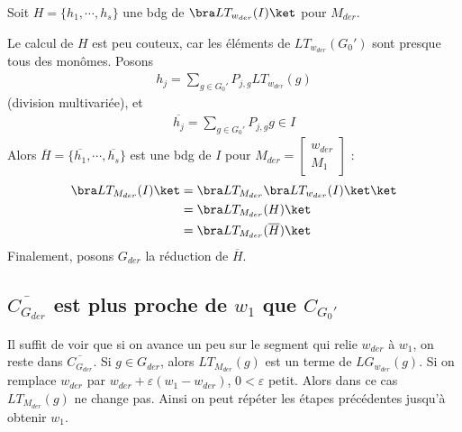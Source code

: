             Soit $H = \{h_1, \cdots, h_s\}$ une bdg de $\bra LT_{w_{der}}(I) \ket$ pour $M_{der}$.
            \begin{remq}
                Le calcul de $H$ est peu couteux, car les éléments de $LT_{w_{der}}(G_0')$ sont presque tous des monômes. Posons
                \begin{align*}
                    h_j = \sum_{g \in G_0'} P_{j,g}LT_{w_{der}}(g)
                \end{align*}
                (division multivariée), et
                \begin{align*}
                    \overline{h_j} = \sum_{g \in G_0'} P_{j,g}g \in I
                \end{align*}
                Alors $\overline{H} = \{\overline{h_1}, \cdots, \overline{h_s}\}$ est une bdg de $I$ pour $M_{der} = \begin{bmatrix} w_{der} \\ M_1 \end{bmatrix}$ :
                \begin{align*}
                    \bra LT_{M_{der}}(I) \ket &= \bra LT_{M_{der}} \bra LT_{w_{der}}(I) \ket \ket \\
                    &= \bra LT_{M_{der}}(H) \ket \\
                    &= \bra LT_{M_{der}}(\overline{H}) \ket \\
                \end{align*}
                Finalement, posons $G_{der}$ la réduction de $\overline{H}$.
            \end{remq}

        \subsection{$\overline{C_{G_{der}}}$ est plus proche de $w_1$ que $C_{G_0'}$}
            Il suffit de voir que si on avance un peu sur le segment qui relie $w_{der}$ à $w_1$, on reste dans $\overline{C_{G_{der}}}$. Si $g \in G_{der}$, alors $LT_{M_{der}}(g)$ est un terme de $LG_{w_{der}}(g)$. Si on remplace $w_{der}$ par $w_{der} + \varepsilon(w_1 - w_{der})$, $0 < \varepsilon$ petit. Alors dans ce cas $LT_{M_{der}}(g)$ ne change pas. Ainsi on peut répéter les étapes précédentes jusqu'à obtenir $w_1$.

